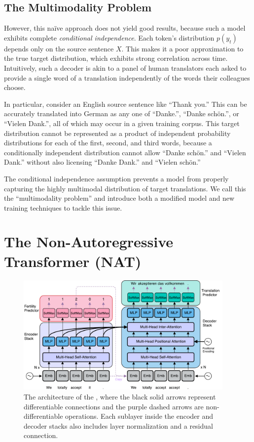 \documentclass{article} %
\begin{document}
\subsection{The Multimodality Problem}
However, this na\"{i}ve approach does not yield good results, because such a model exhibits complete \emph{conditional independence}.
Each token's distribution $p(y_t)$  depends only on the source sentence $X$. 
This makes it a poor approximation to the true target distribution, which exhibits strong correlation across time. 
Intuitively, such a decoder is akin to a panel of human translators each asked to provide a single word of a translation independently of the words their colleagues choose.

In particular, consider an English source sentence like ``Thank you.'' This can be accurately translated into German as any one of ``Danke.'', ``Danke sch\"{o}n.'', or ``Vielen Dank.'', all of which may occur in a given training corpus. This target distribution cannot be represented as a product of independent probability distributions for each of the first, second, and third words, because a conditionally independent distribution cannot allow ``Danke sch\"{o}n.'' and ``Vielen Dank.'' without also licensing ``Danke Dank.'' and ``Vielen sch\"{o}n.''

The conditional independence assumption prevents a model from properly capturing the highly multimodal distribution of target translations.
We call this the ``multimodality problem'' and introduce both a modified model and new training techniques to tackle this issue.

\section{The Non-Autoregressive Transformer (NAT)}\label{mainModelSection}

\begin{figure}
\centering
\includegraphics[width=0.95\textwidth]{figures/NAT-sub}
\caption{\label{fig.diagram} The architecture of the \model{}, where the black solid arrows represent differentiable connections and the purple dashed arrows are non-differentiable operations. Each sublayer inside the encoder and decoder stacks also includes layer normalization and a residual connection.}
\vspace{-20pt}
\end{figure}
\end{document}
